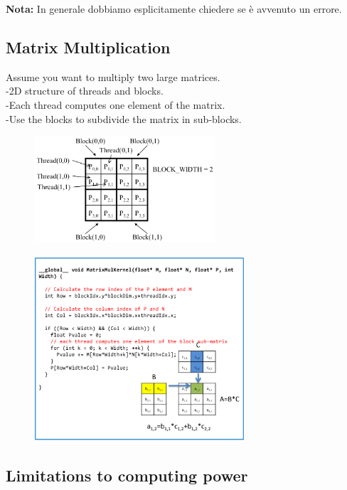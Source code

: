 \noindent
\textbf{Nota:} In generale dobbiamo esplicitamente chiedere se è avvenuto un errore.

\subsection{Matrix Multiplication}

Assume you want to multiply two large matrices.\\
-2D structure of threads and blocks.\\
-Each thread computes one element of the matrix.\\
-Use the blocks to subdivide the matrix in sub-blocks.\\

\begin{figure}[ht]
	\centering
	\includegraphics[width=0.6\textwidth]{figure_parallel/matrix_mult.png}
\end{figure}


\begin{figure}[ht]
	\centering
	\includegraphics[width=0.7\textwidth]{figure_parallel/mm.png}
\end{figure}
\FloatBarrier

\subsection{Limitations to computing power}

